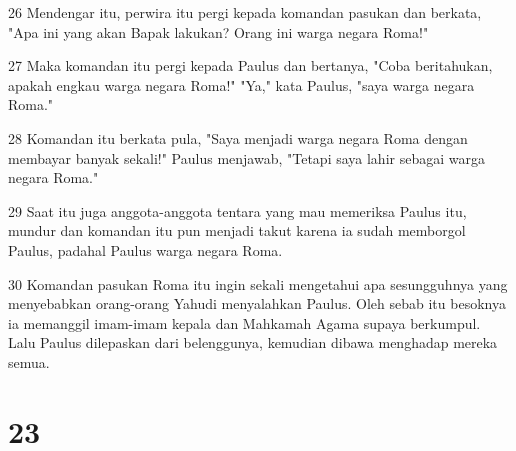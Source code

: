 \par 26 Mendengar itu, perwira itu pergi kepada komandan pasukan dan berkata, "Apa ini yang akan Bapak lakukan? Orang ini warga negara Roma!"
\par 27 Maka komandan itu pergi kepada Paulus dan bertanya, "Coba beritahukan, apakah engkau warga negara Roma!" "Ya," kata Paulus, "saya warga negara Roma."
\par 28 Komandan itu berkata pula, "Saya menjadi warga negara Roma dengan membayar banyak sekali!" Paulus menjawab, "Tetapi saya lahir sebagai warga negara Roma."
\par 29 Saat itu juga anggota-anggota tentara yang mau memeriksa Paulus itu, mundur dan komandan itu pun menjadi takut karena ia sudah memborgol Paulus, padahal Paulus warga negara Roma.
\par 30 Komandan pasukan Roma itu ingin sekali mengetahui apa sesungguhnya yang menyebabkan orang-orang Yahudi menyalahkan Paulus. Oleh sebab itu besoknya ia memanggil imam-imam kepala dan Mahkamah Agama supaya berkumpul. Lalu Paulus dilepaskan dari belenggunya, kemudian dibawa menghadap mereka semua.

\chapter{23}

